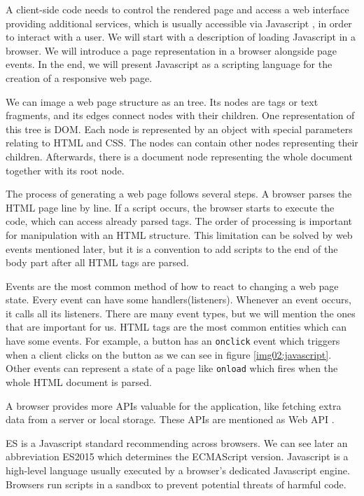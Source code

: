 A client-side code needs to control the rendered page and access a web interface providing additional services, which is usually accessible via Javascript \cite{online:javascriptWiki}, in order to interact with a user.
We will start with a description of loading Javascript in a browser.
We will introduce a page representation in a browser alongside page events.
In the end, we will present Javascript as a scripting language for the creation of a responsive web page.
\par
We can image a web page structure as an tree.
Its nodes are tags or text fragments, and its edges connect nodes with their children.
One representation of this tree is \ac{DOM}.
Each node is represented by an object with special parameters relating to HTML and CSS. 
The nodes can contain other nodes representing their children.
Afterwards, there is a document node representing the whole document together with its root node.
\par
The process of generating a web page follows several steps.
A browser parses the HTML page line by line. If a script occurs, the browser starts to execute the code, which can access already parsed tags.
The order of processing is important for manipulation with an HTML structure.
This limitation can be solved by web events mentioned later, but
it is a convention to add scripts to the end of the body part after all HTML tags are parsed.
\par
Events are the most common method of how to react to changing a web page state.
Every event can have some handlers(listeners).
Whenever an event occurs, it calls all its listeners.
There are many event types, but we will mention the ones that are important for us.
HTML tags are the most common entities which can have some events.
For example, a button has an \texttt{onclick} event which triggers when a client clicks on the button as we can see in figure \ref{img02:javascript}. 
Other events can represent a state of a page like \texttt{onload} which fires when the whole HTML document is parsed.
\par
A browser provides more APIs valuable for the application, like fetching extra data from a server or local storage.
These APIs are mentioned as Web API \cite{online:webApi}.
\par
\ac{ES} is a Javascript standard recommending across browsers.
We can see later an abbreviation ES2015 which determines the ECMAScript version.
Javascript is a high-level language usually executed by a browser's dedicated Javascript engine.
Browsers run scripts in a sandbox to prevent potential threats of harmful code.
